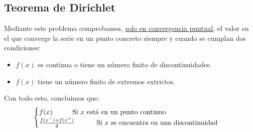 \subsection{Teorema de Dirichlet}
 Mediante este problema comprobamos, \underline{solo en convergencia puntual}, el valor en el que converge la serie en un punto concreto siempre y cuando se cumplan dos condiciones:
\begin{itemize}
        \item \(f(x)\) es continua o tiene un número finito de discontinuidades.
        \item \(f(x)\) tiene un número finito de extremos extrictos.
\end{itemize}
 Con todo esto, concluimos que:
\[
        \begin{cases}
                f(x) \text{\hspace{1cm}Si \(x\) está en un punto continuo}
                \\
                \frac{f(x^-) + f(x^+)}{2} \text{ \hspace{1cm}Si \(x\) se encuentra en una discontinuidad}
        \end{cases}
\]